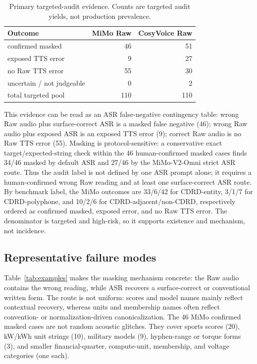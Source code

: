 \documentclass{article}
\begin{document}
\begin{table}[H]
\centering
\caption{Primary targeted-audit evidence. Counts are targeted audit yields, not production prevalence.}
\label{tab:audit}
\small
\begin{tabular}{@{}lrr@{}}
\toprule
Outcome & MiMo Raw & CosyVoice Raw \\
\midrule
confirmed masked & 46 & 51 \\
exposed TTS error & 9 & 27 \\
no Raw TTS error & 55 & 30 \\
uncertain / not judgeable & 0 & 2 \\
total targeted pool & 110 & 110 \\
\bottomrule
\end{tabular}
\end{table}

This evidence can be read as an ASR false-negative contingency table: wrong Raw audio plus surface-correct ASR is a masked false negative (46); wrong Raw audio plus exposed ASR is an exposed TTS error (9); correct Raw audio is no Raw TTS error (55). Masking is protocol-sensitive: a conservative exact target/expected-string check within the 46 human-confirmed masked cases finds 34/46 masked by default ASR and 27/46 by the MiMo-V2-Omni strict ASR route. Thus the audit label is not defined by one ASR prompt alone; it requires a human-confirmed wrong Raw reading and at least one surface-correct ASR route. By benchmark label, the MiMo outcomes are 33/6/42 for CDRD-entity, 3/1/7 for CDRD-polyphone, and 10/2/6 for CDRD-adjacent/non-CDRD, respectively ordered as confirmed masked, exposed error, and no Raw TTS error. The denominator is targeted and high-risk, so it supports existence and mechanism, not incidence.

\subsection{Representative failure modes}

Table~\ref{tab:examples} makes the masking mechanism concrete: the Raw audio contains the wrong reading, while ASR recovers a surface-correct or conventional written form. The route is not uniform: scores and model names mainly reflect contextual recovery, whereas units and membership names often reflect convention- or normalization-driven canonicalization. The 46 MiMo confirmed masked cases are not random acoustic glitches. They cover sports scores (20), kW/kWh unit strings (10), military models (9), hyphen-range or torque forms (3), and smaller financial-quarter, compute-unit, membership, and voltage categories (one each).
\end{document}
